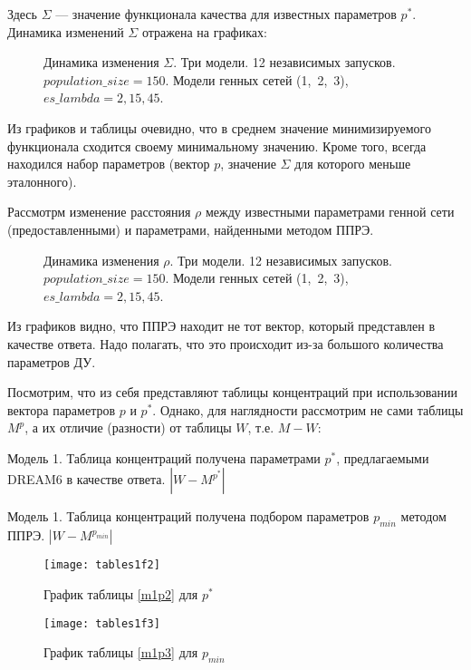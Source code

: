Здесь $\Sigma$ — значение функционала качества для известных параметров $p^*$.
Динамика изменений $\Sigma$ отражена на графиках:

\begin{figure}[h]
  \center{\texttt{[image: p150]}}
  \caption{Динамика изменения $\Sigma$. Три модели. 12 независимых запусков. 
  $population\_size = 150$. Модели генных сетей (1,~2,~3), 
  $es\_lambda = 2, 15, 45$.}
  \label{img:p150}
\end{figure}

Из графиков и таблицы очевидно, что в среднем значение минимизируемого 
функционала сходится своему минимальному значению. Кроме того, всегда находился 
набор параметров (вектор $p$, значение $\Sigma$ для которого меньше эталонного).

Рассмотрм изменение расстояния $\rho$ между известными параметрами генной сети 
(предоставленными) и параметрами, найденными методом ППРЭ.

\begin{figure}[h]
  \center{\texttt{[image: p150e]}}
  \caption{Динамика изменения $\rho$. Три модели. 12 независимых запусков. 
  $population\_size = 150$. Модели генных сетей (1,~2,~3), 
  $es\_lambda = 2, 15, 45$. }
  \label{img:p150}
\end{figure}

Из графиков видно, что ППРЭ находит не тот вектор, который представлен в 
качестве ответа. Надо полагать, что это происходит из-за большого количества 
параметров ДУ.

Посмотрим, что из себя представляют таблицы концентраций при использовании 
вектора параметров $p$ и $p^*$. Однако, для наглядности рассмотрим не сами 
таблицы $M^p$, а их отличие (разности) от таблицы $W$, т.е. $M - W$:


\begin{table}[h]
  \centering
  
  \caption{Модель 1. Таблица концентраций получена параметрами $p^*$, 
  предлагаемыми DREAM6 в качестве ответа. $|W - M^{p^*}|$}
  \label{m1p2}
\end{table}
\begin{table}[h]
  \centering
  
  \caption{Модель 1. Таблица концентраций получена подбором параметров 
  $p_{min}$ методом ППРЭ. $|W - M^{p_{min}}|$}
  \label{m1p3}
\end{table}
\begin{figure}[h]
  \begin{minipage}[h]{0.5\linewidth}
    \texttt{[image: tables1f2]}
    \caption{График таблицы \ref{m1p2} для $p^*$}
  \end{minipage}
  \hfill
  \begin{minipage}[h]{0.5\linewidth}
    \texttt{[image: tables1f3]}
    \caption{График таблицы \ref{m1p3} для $p_{min}$}
  \end{minipage}
\end{figure}


